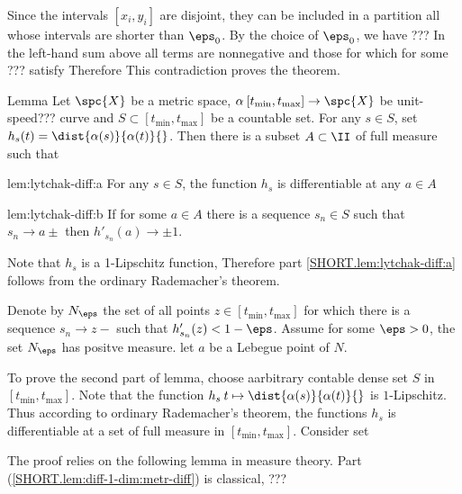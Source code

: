 Since the intervals $[x_i,y_i]$ are disjoint, 
they can be included
in a partition all whose intervals are shorter than $\eps_0$. 
By the choice of $\eps_0$, we have ???
In the left-hand sum above all terms are nonnegative and those for which for some ??? satisfy
Therefore
This contradiction proves the theorem.
\qeds

\begin{thm}{Lemma}\label{lem:lytchak-diff}
Let $\spc{X}$ be a metric space,
$\alpha\:[t_{\min},t_{\max}]\to\spc{X}$ be unit-speed??? curve 
and $S\subset [t_{\min},t_{\max}]$ be a countable set.
For any $s\in S$, set $h_s(t)=\dist{\alpha(s)}{\alpha(t)}{}$.
Then there is a subset $A\subset \II$ of full measure 
such that 
\begin{subthm}{lem:lytchak-diff:a}
For any $s\in S$, the function $h_s$ is differentiable at any $a\in A$
\end{subthm}

\begin{subthm}{lem:lytchak-diff:b}
If for some $a\in A$ there is a sequence $s_n\in S$ such that $s_n\to a\pm$ then $h'_{s_n}(a)\to\pm1$.
\end{subthm}

\end{thm}

Note that $h_s$ is a 1-Lipschitz function, 
Therefore part \ref{SHORT.lem:lytchak-diff:a} follows from the ordinary Rademacher's theorem.

Denote by $N_\eps$ the set of all points $z\in[t_{\min},t_{\max}]$
for which there is a sequence $s_n\to z-$ such that $h_{s_n}'(z)<1-\eps$.
Assume for some $\eps>0$, the set $N_\eps$ has positve measure.
let $a$ be a Lebegue point of $N$.


To prove the second part of lemma, choose aarbitrary contable dense set $S$ in $[t_{\min},t_{\max}]$.
Note that the function $h_s\:t\mapsto\dist{\alpha(s)}{\alpha(t)}{}$ is $1$-Lipschitz.
Thus according to ordinary Rademacher's theorem, the functions $h_s$ is differentiable at a set of full measure in $[t_{\min},t_{\max}]$.
Consider set 


\qeds

The proof relies on the following lemma in measure theory.
Part (\ref{SHORT.lem:diff-1-dim:metr-diff}) is classical, ???

